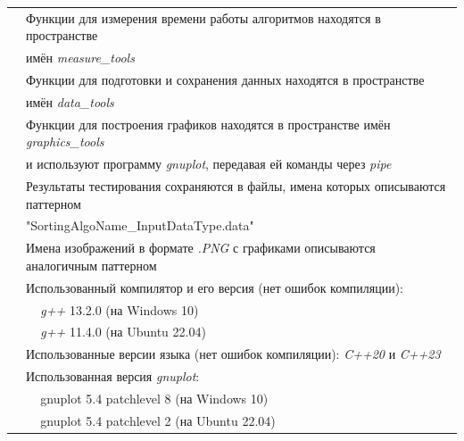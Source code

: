\documentclass[11pt,a4paper]{article}
\begin{document}
\begin{tabular}{rl}
    &  Функции для измерения времени работы
    алгоритмов находятся в пространстве \\
    & имён \textit{measure\_tools} \\
    & Функции для подготовки и сохранения
    данных находятся в пространстве \\
    & имён \textit{data\_tools} \\
    & Функции для построения графиков находятся 
    в пространстве имён \textit{graphics\_tools} \\
    & и используют программу \textit{gnuplot},
    передавая ей команды через \textit{pipe} \\
    & Результаты тестирования сохраняются в
    файлы, имена которых описываются паттерном \\
    & "SortingAlgoName\_InputDataType.data" \\
    & Имена изображений в формате \textit{.PNG} 
    с графиками описываются аналогичным паттерном \\
    & Использованный компилятор и его версия (нет ошибок компиляции): \\ 
    & \,\,\,\,\, \textit{g++} 13.2.0 (на Windows 10) \\
    & \,\,\,\,\, \textit{g++}  11.4.0 (на Ubuntu 22.04) \\
    & Использованные версии языка (нет ошибок компиляции): 
    \textit{C++20} и \textit{C++23} \\
    & Использованная версия \textit{gnuplot}: \\
    & \,\,\,\,\, gnuplot 5.4 patchlevel 8 (на Windows 10) \\
    & \,\,\,\,\, gnuplot 5.4 patchlevel 2 (на Ubuntu 22.04) \\
\end{tabular}
\end{document}
